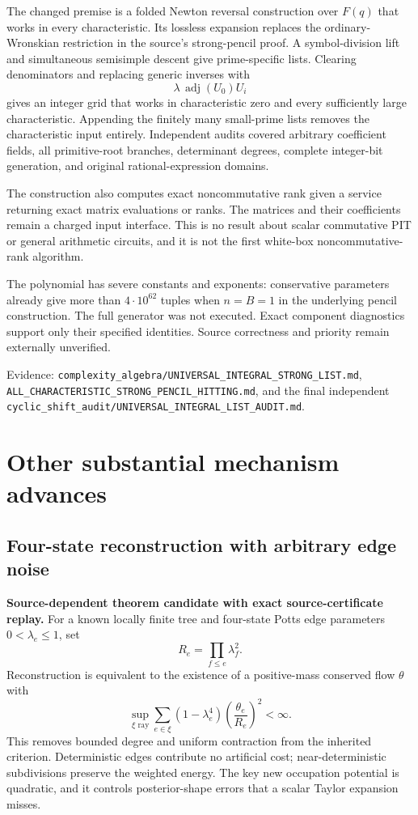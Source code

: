 \documentclass[11pt]{article}
\begin{document}
The changed premise is a folded Newton reversal construction over $F(q)$ that works in every characteristic. Its lossless expansion replaces the ordinary-Wronskian restriction in the source's strong-pencil proof. A symbol-division lift and simultaneous semisimple descent give prime-specific lists. Clearing denominators and replacing generic inverses with
\[
 \lambda\,\operatorname{adj}(U_0)U_i
\]
gives an integer grid that works in characteristic zero and every sufficiently large characteristic. Appending the finitely many small-prime lists removes the characteristic input entirely. Independent audits covered arbitrary coefficient fields, all primitive-root branches, determinant degrees, complete integer-bit generation, and original rational-expression domains.

The construction also computes exact noncommutative rank given a service returning exact matrix evaluations or ranks. The matrices and their coefficients remain a charged input interface. This is no result about scalar commutative PIT or general arithmetic circuits, and it is not the first white-box noncommutative-rank algorithm.

The polynomial has severe constants and exponents: conservative parameters already give more than $4\cdot10^{62}$ tuples when $n=B=1$ in the underlying pencil construction. The full generator was not executed. Exact component diagnostics support only their specified identities. Source correctness and priority remain externally unverified.

Evidence: \texttt{complexity\_algebra/UNIVERSAL\_INTEGRAL\_STRONG\_LIST.md}, \texttt{ALL\_CHARACTERISTIC\_STRONG\_PENCIL\_HITTING.md}, and the final independent \texttt{cyclic\_shift\_audit/UNIVERSAL\_INTEGRAL\_LIST\_AUDIT.md}.

\section{Other substantial mechanism advances}
\subsection{Four-state reconstruction with arbitrary edge noise}
\textbf{Source-dependent theorem candidate with exact source-certificate replay.} For a known locally finite tree and four-state Potts edge parameters $0<\lambda_e\le1$, set
\[
 R_e=\prod_{f\le e}\lambda_f^2.
\]
Reconstruction is equivalent to the existence of a positive-mass conserved flow $\theta$ with
\[
 \sup_{\xi\text{ ray}}\sum_{e\in\xi}(1-\lambda_e^4)
                  \left(\frac{\theta_e}{R_e}\right)^2<\infty.
\]
This removes bounded degree and uniform contraction from the inherited criterion. Deterministic edges contribute no artificial cost; near-deterministic subdivisions preserve the weighted energy. The key new occupation potential is quadratic, and it controls posterior-shape errors that a scalar Taylor expansion misses.
\end{document}
